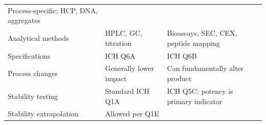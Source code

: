 \documentclass[
  11pt,
  a4paper,
]{report}
\begin{document}
\begin{longtable}[]{@{}lll@{}}
\begin{minipage}[t]{0.28\columnwidth}
Process-specific; HCP, DNA, aggregates\strut
\end{minipage}\tabularnewline
\begin{minipage}[t]{0.22\columnwidth}\raggedright
Analytical methods\strut
\end{minipage} & \begin{minipage}[t]{0.41\columnwidth}\raggedright
HPLC, GC, titration\strut
\end{minipage} & \begin{minipage}[t]{0.28\columnwidth}\raggedright
Bioassays, SEC, CEX, peptide mapping\strut
\end{minipage}\tabularnewline
\begin{minipage}[t]{0.22\columnwidth}\raggedright
Specifications\strut
\end{minipage} & \begin{minipage}[t]{0.41\columnwidth}\raggedright
ICH Q6A\strut
\end{minipage} & \begin{minipage}[t]{0.28\columnwidth}\raggedright
ICH Q6B\strut
\end{minipage}\tabularnewline
\begin{minipage}[t]{0.22\columnwidth}\raggedright
Process changes\strut
\end{minipage} & \begin{minipage}[t]{0.41\columnwidth}\raggedright
Generally lower impact\strut
\end{minipage} & \begin{minipage}[t]{0.28\columnwidth}\raggedright
Can fundamentally alter product\strut
\end{minipage}\tabularnewline
\begin{minipage}[t]{0.22\columnwidth}\raggedright
Stability testing\strut
\end{minipage} & \begin{minipage}[t]{0.41\columnwidth}\raggedright
Standard ICH Q1A\strut
\end{minipage} & \begin{minipage}[t]{0.28\columnwidth}\raggedright
ICH Q5C; potency is primary indicator\strut
\end{minipage}\tabularnewline
\begin{minipage}[t]{0.22\columnwidth}\raggedright
Stability extrapolation\strut
\end{minipage} & \begin{minipage}[t]{0.41\columnwidth}\raggedright
Allowed per Q1E\strut
\end{minipage} & \begin{minipage}[t]{0.28\columnwidth}\raggedright

\end{minipage}
\end{longtable}
\end{document}
